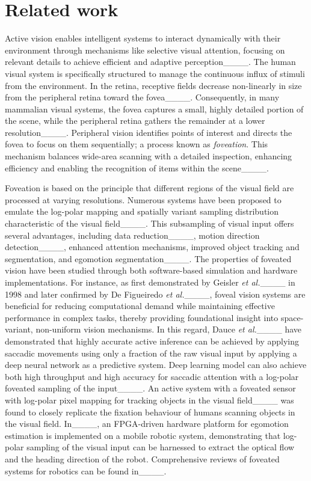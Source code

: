 \section{Related work}
\label{ch:relworks} 

Active vision enables intelligent systems to interact dynamically with their environment through mechanisms like selective visual attention, focusing on relevant details to achieve efficient and adaptive perception____. The human visual system is specifically structured to manage the continuous influx of stimuli from the environment. In the retina, receptive fields decrease non-linearly in size from the peripheral retina toward the fovea____. Consequently, in many mammalian visual systems, the fovea captures a small, highly detailed portion of the scene, while the peripheral retina gathers the remainder at a lower resolution____. Peripheral vision identifies points of interest and directs the fovea to focus on them sequentially; a process known as \textit{foveation}. This mechanism balances wide-area scanning with a detailed inspection, enhancing efficiency and enabling the recognition of items within the scene____.

Foveation is based on the principle that different regions of the visual field are processed at varying resolutions. Numerous systems have been proposed to emulate the log-polar mapping and spatially variant sampling distribution characteristic of the visual field____. This subsampling of visual input offers several advantages, including data reduction____, motion direction detection____, enhanced attention mechanisms, improved object tracking and segmentation, and egomotion segmentation____.
The properties of foveated vision have been studied through both software-based simulation and hardware implementations. For instance, as first demonstrated by Geisler \emph{et al.}____ in 1998 and later confirmed by De Figueiredo \emph{et al.}____, foveal vision systems are beneficial for reducing computational demand while maintaining effective performance in complex tasks, thereby providing foundational insight into space-variant, non-uniform vision mechanisms. In this regard, Dauce \emph{et al.}____ have demonstrated that highly accurate active inference can be achieved by applying saccadic movements using only a fraction of the raw visual input by applying a deep neural network as a predictive system. Deep learning model can also achieve both high throughput and high accuracy for saccadic attention with a log-polar foveated sampling of the input____. An active system with a foveated sensor with log-polar pixel mapping for tracking objects in the visual field____ was found to closely replicate the fixation behaviour of humans scanning objects in the visual field. In____, an FPGA-driven hardware platform for egomotion estimation is implemented on a mobile robotic system, demonstrating that log-polar sampling of the visual input can be harnessed to extract the optical flow and the heading direction of the robot. Comprehensive reviews of foveated systems for robotics can be found in____.

